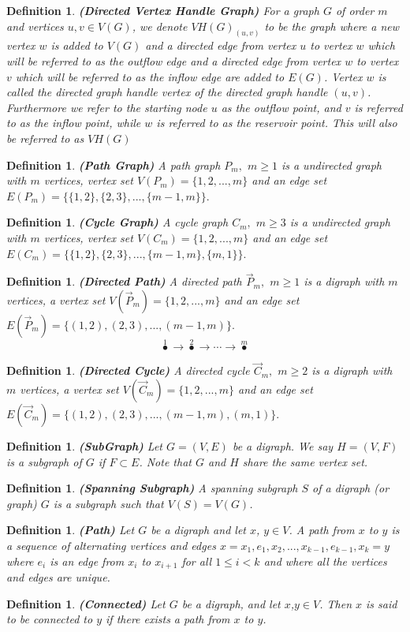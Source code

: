 \documentclass[twoside,11pt]{article}
\newtheorem{definition}[theorem]{Definition}
\numberwithin{equation}{section} \DeclareMathOperator{\Var}{Var}
\newcommand{\bdf}{\begin{definition}}
\newcommand{\edf}{\end{definition}}
\newcommand{\ora}[1]{\overrightarrow{#1}}
\newcommand{\ra}{\rightarrow}
\begin{document}
\bdf {\bf{(Directed Vertex Handle Graph)}}
For a graph $G$ of order $m$ and vertices $u,v\in V(G)$, we denote $VH(G)_{(u,v)}$ to be the graph where a new vertex $w$ is added to $V(G)$ and a directed edge from vertex $u$ to vertex $w$ which will be referred to as the outflow edge and a directed edge from vertex $w$ to vertex $v$  which will be referred to as the inflow edge are added to $E(G)$. Vertex $w$ is called \rm the directed graph handle vertex \it of the directed graph handle $(u,v)$. Furthermore we refer to the starting node $u$ as the outflow point, and $v$ is referred to as the inflow point, while $w$ is referred to as the reservoir point. This will also be referred to as $VH(G)$
\edf


\bdf
{\bf (Path Graph)}
A {\it path graph } ${P_m},$ $m\geq 1$ is a undirected graph with $m$ vertices,
vertex set $V({P_m})=\{1,2,...,m\}$ and an edge set $E({P_m})=\{\{1,2\},\{2,3\},...,\{m-1,m\}\}.$
\edf

\bdf
{\bf (Cycle Graph)}
A {\it cycle graph } ${C_m},$ $m\geq 3$ is a undirected graph with $m$ vertices, vertex set  $V({C_m})=\{1,2,...,m\}$ and an edge set $E({C_m})=\{\{1,2\},\{2,3\},...,\{m-1,m\}, \{m,1\}\}.$
\edf

\bdf
{\bf (Directed Path)}
A {\it directed path } $\ora{P}_m,$ $m\geq 1$ is a digraph with $m$ vertices, a vertex set
 $V(\ora{P}_m)=\{1,2,...,m\}$ and an edge set $E(\ora{P}_m)=\{(1,2),(2,3),...,(m-1,m)\}.$
$$\overset{1}{\bullet}\ra \overset{2}{\bullet} \ra \cdots \ra \overset{m}{\bullet}$$
\edf

\bdf
{\bf (Directed Cycle)}
A {\it directed cycle } $\ora{C}_m,$ $m\geq 2$ is a digraph with $m$ vertices, a vertex set
$V(\ora{C}_m)=\{1,2,...,m\}$ and an edge set $E(\ora{C}_m)=\{(1,2),(2,3),...,(m-1,m),(m,1)\}.$
\edf

\bdf
{\bf (SubGraph)}
Let $G= (V,E)$ be a digraph.  We say $H= (V,F)$ is a subgraph of $G$ if $F \subset E$.  Note that $G$ and $H$ share the same vertex set.
\edf

\bdf
{\bf (Spanning Subgraph)}
A {\it spanning subgraph} $S$ of a digraph (or graph) $G$ is a subgraph such that $V(S)=V(G)$.
\edf

\bdf
{\bf (Path)}
Let $G$ be a digraph and let $x$, $y \in V$.  A path from $x$ to $y$ is a sequence of alternating vertices and edges \({x = x_1,e_1,x_2,...,x_{k−1},e_{k−1},x_{k} = y}\) where $e_i$ is an edge from $x_i$ to $x_{i+1}$ for all $1 \leq i < k$ and where all the vertices and edges are unique.
\edf

\bdf
{\bf (Connected)}
Let $G$ be a digraph, and let $x$,$y \in V$.  Then $x$ is said to be connected to $y$ if there exists a path from $x$ to $y$.
\edf
\end{document}
